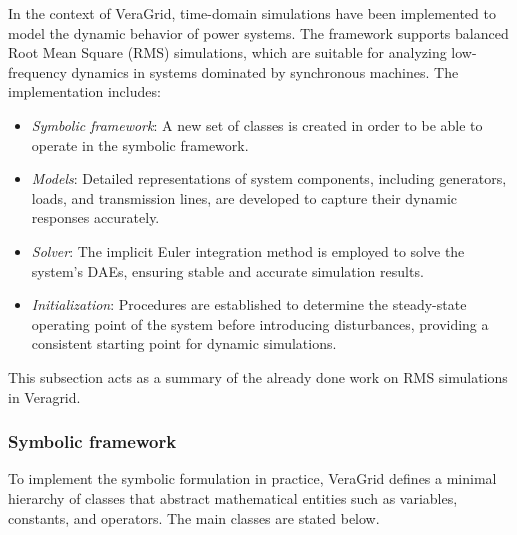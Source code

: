 In the context of VeraGrid, time-domain simulations have been implemented to model the dynamic behavior of power systems.
The framework supports balanced Root Mean Square (RMS) simulations, which are suitable for analyzing low-frequency dynamics in systems dominated by synchronous machines.
The implementation includes:

\begin{itemize}
    \item \textit{Symbolic framework}: A new set of classes is created in order to be able to operate in the symbolic framework.
    \item \textit{Models}: Detailed representations of system components, including generators, loads, and transmission lines, are developed to capture their dynamic
    responses accurately.
    \item \textit{Solver}: The implicit Euler integration method is employed to solve the system's DAEs, ensuring stable and accurate simulation results.
    \item \textit{Initialization}: Procedures are established to determine the steady-state operating point of the system before introducing disturbances,
    providing a consistent starting point for dynamic simulations.
\end{itemize}

This subsection acts as a summary of the already done work on RMS simulations in Veragrid.

\subsubsection{Symbolic framework}
To implement the symbolic formulation in practice, VeraGrid defines a minimal hierarchy  of classes that abstract mathematical entities such as variables,
 constants, and operators. The main classes are stated below.

